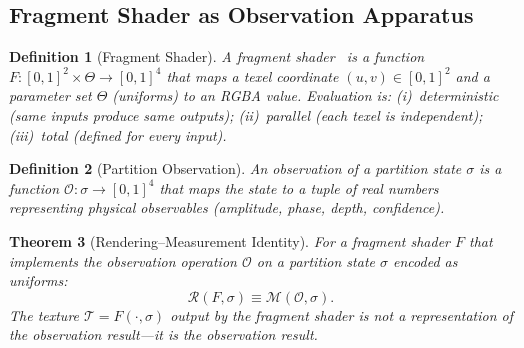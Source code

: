 \documentclass[11pt,twocolumn,a4paper]{article}
\newtheorem{theorem}{Theorem}[section]
\newtheorem{definition}[theorem]{Definition}
\newcommand{\Obs}{\mathcal{O}}
\newcommand{\Rend}{\mathcal{R}}
\newcommand{\Meas}{\mathcal{M}}
\newcommand{\Tex}{\mathcal{T}}
\begin{document}
\subsection{Fragment Shader as Observation Apparatus}

\begin{definition}[Fragment Shader]
\label{def:fragment-shader}
A \emph{fragment shader}~\citep{khronosglsl,khronoswebgl2} is a
function $F : [0,1]^2 \times \Theta \to [0,1]^4$ that maps a texel
coordinate $(u,v) \in [0,1]^2$ and a parameter set
$\Theta$ (uniforms) to an RGBA value.  Evaluation is:
(i)~deterministic (same inputs produce same outputs);
(ii)~parallel (each texel is independent);
(iii)~total (defined for every input).
\end{definition}

\begin{definition}[Partition Observation]
\label{def:observation}
An \emph{observation} of a partition state $\sigma$ is a function
$\Obs : \sigma \to [0,1]^4$ that maps the state to a tuple of real
numbers representing physical observables (amplitude, phase, depth,
confidence).
\end{definition}

\begin{theorem}[Rendering--Measurement Identity]
\label{thm:rmi}
For a fragment shader $F$ that implements the observation operation
$\Obs$ on a partition state $\sigma$ encoded as uniforms:
\begin{equation}
  \Rend(F, \sigma) \equiv \Meas(\Obs, \sigma).
  \label{eq:rmi}
\end{equation}
The texture $\Tex = F(\cdot, \sigma)$ output by the fragment shader is
not a representation of the observation result---it \emph{is} the
observation result.
\end{theorem}
\end{document}
